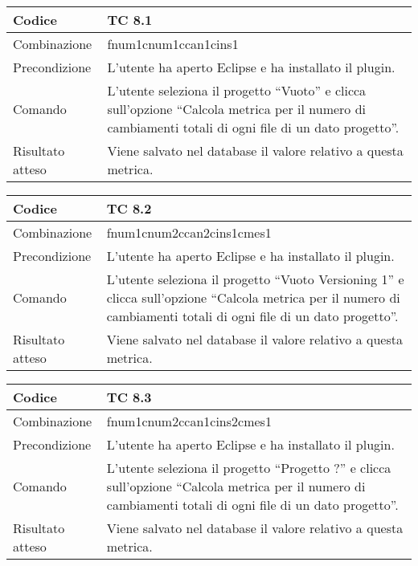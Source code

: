 \begin{table}[ht]
\begin{tabular}{|p{3cm}|p{9cm}|}
\hline
\cellcolor{lightgray}Codice				& TC 8.1								\\
\hline
\cellcolor{lightgray}Combinazione		& fnum1cnum1ccan1cins1									\\
\hline
\cellcolor{lightgray}Precondizione		& L'utente ha aperto Eclipse e ha installato il plugin.		\\
\hline
\cellcolor{lightgray}Comando			& L'utente seleziona il progetto ``Vuoto''  e clicca sull'opzione ``Calcola metrica per il numero di cambiamenti totali di ogni file di un dato progetto''.	\\
\hline
\cellcolor{lightgray}Risultato atteso	& Viene salvato nel database il valore relativo a questa metrica.\\
\hline
\end{tabular}
\end{table}

\begin{table}[ht]
\begin{tabular}{|p{3cm}|p{9cm}|}
\hline
\cellcolor{lightgray}Codice				& TC 8.2								\\
\hline
\cellcolor{lightgray}Combinazione		& fnum1cnum2ccan2cins1cmes1									\\
\hline
\cellcolor{lightgray}Precondizione		& L'utente ha aperto Eclipse e ha installato il plugin.		\\
\hline
\cellcolor{lightgray}Comando			& L'utente seleziona il progetto ``Vuoto Versioning 1''  e clicca sull'opzione ``Calcola metrica per il numero di cambiamenti totali di ogni file di un dato progetto''.	\\
\hline
\cellcolor{lightgray}Risultato atteso	& Viene salvato nel database il valore relativo a questa metrica.\\
\hline
\end{tabular}
\end{table}

\begin{table}[ht]
\begin{tabular}{|p{3cm}|p{9cm}|}
\hline
\cellcolor{lightgray}Codice				& TC 8.3								\\
\hline
\cellcolor{lightgray}Combinazione		& fnum1cnum2ccan1cins2cmes1									\\
\hline
\cellcolor{lightgray}Precondizione		& L'utente ha aperto Eclipse e ha installato il plugin.		\\
\hline
\cellcolor{lightgray}Comando			& L'utente seleziona il progetto ``Progetto ?''  e clicca sull'opzione ``Calcola metrica per il numero di cambiamenti totali di ogni file di un dato progetto''.	\\
\hline
\cellcolor{lightgray}Risultato atteso	& Viene salvato nel database il valore relativo a questa metrica.\\
\hline
\end{tabular}
\end{table}

